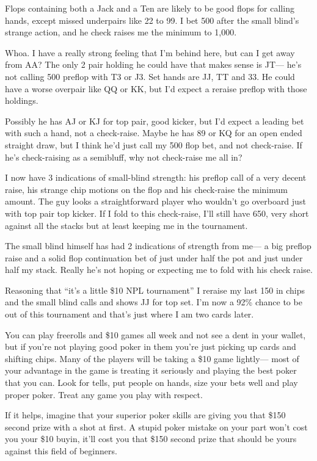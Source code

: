 Flops containing both a Jack and a Ten are likely to be good flops
for calling hands, except missed underpairs like 22 to 99. I bet
500 after the small blind's strange action, and he check raises me
the minimum to 1,000.

Whoa. I have a really strong feeling that I'm behind here, but can
I get away from AA? The only 2 pair holding he could have that makes
sense is JT--- he's not calling 500 preflop with T3 or J3. Set hands
are JJ, TT and 33. He could have a worse overpair like QQ or KK,
but I'd expect a reraise preflop with those holdings.

Possibly he has AJ or KJ for top pair, good kicker, but I'd
expect a leading bet with such a hand, not a check-raise. Maybe he
has 89 or KQ for an open ended straight draw, but I think he'd just
call my 500 flop bet, and not check-raise. If he's check-raising
as a semibluff, why not check-raise me all in?

I now have 3 indications of small-blind strength: his preflop call
of a very decent raise, his strange chip motions on the flop and his
check-raise the minimum amount. The guy looks a straightforward player
who wouldn't go overboard just with top pair top kicker. If I fold
to this check-raise, I'll still have 650, very short
against all the stacks but at least keeping me in the tournament.

The small blind himself has had 2 indications of strength from
me--- a big preflop raise and a solid flop continuation bet of just
under half the pot and just under half my stack. Really he's not hoping
or expecting me to fold with his check raise.

Reasoning that ``it's a little \$10 NPL tournament'' I reraise my
last 150 in chips and the small blind calls and shows JJ for top set.
I'm now a 92\% chance to be out of this tournament and that's just where
I am two cards later.

You can play freerolls and \$10 games all week and not see a dent
in your wallet, but if you're not playing good poker in them you're
just picking up cards and shifting chips. Many of the players will
be taking a \$10 game lightly--- most of your advantage in the game
is treating it seriously and playing the best poker that you can.
Look for tells, put people on hands, size your bets well and
play proper poker. Treat any game you play with respect.

If it helps, imagine that your superior poker skills are giving
you that \$150 second prize with a shot at first. A stupid poker
mistake on your part won't cost you your \$10 buyin, it'll cost
you that \$150 second prize that should be yours against this
field of beginners.

